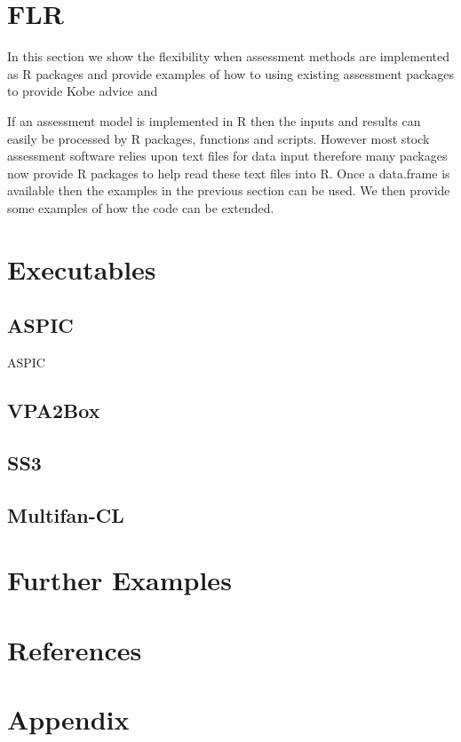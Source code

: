 \documentclass[a4paper, 11pt, oldtoc]{artikel1}
\begin{document}
\section*{FLR}

In this section we show the flexibility when assessment methods are implemented as R packages and provide examples of how to using existing assessment packages 
to provide Kobe advice and 

If an assessment model is implemented in R then the inputs and results can easily be processed by R packages, functions and scripts. However most stock assessment 
software relies upon text files for data input therefore many packages now provide R packages to help read these text files into R. Once a data.frame is
available then the examples in the previous section can be used. We then provide some examples of how the code can be extended. 

\section*{Executables}

\subsection*{ASPIC}

ASPIC

\subsection*{VPA2Box}
\subsection*{SS3}
\subsection*{Multifan-CL}

\section*{Further Examples}


\section*{References}

\section*{Appendix}
\end{document}
